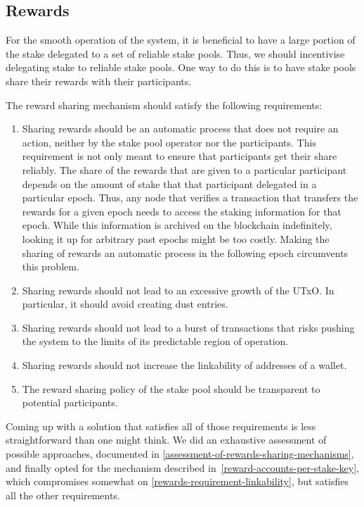 \documentclass[11pt,a4paper]{article}
\begin{document}
\subsection{Rewards}
\label{rewards}

For the smooth operation of the system, it is beneficial to have a large
portion of the stake delegated to a set of reliable stake pools. Thus,
we should incentivise delegating stake to reliable stake pools. One way
to do this is to have stake pools share their rewards with their
participants.

The reward sharing mechanism should satisfy the following requirements:

\begin{enumerate}
\item
  Sharing rewards should be an automatic process that does not require
  an action, neither by the stake pool operator nor the participants.
  This requirement is not only meant to ensure that participants get
  their share reliably. The share of the rewards that are given to a
  particular participant depends on the amount of stake that that
  participant delegated in a particular epoch. Thus, any node that
  verifies a transaction that transfers the rewards for a given epoch
  needs to access the staking information for that epoch. While this
  information is archived on the blockchain indefinitely, looking it up
  for arbitrary past epochs might be too costly. Making the sharing of
  rewards an automatic process in the following epoch circumvents this
  problem.
\item
  Sharing rewards should not lead to an excessive growth of the UTxO. In
  particular, it should avoid creating dust entries.
\item
  Sharing rewards should not lead to a burst of transactions that risks
  pushing the system to the limits of its predictable region of
  operation.
\item\label{rewards-requirement-linkability}
  Sharing rewards should not increase the linkability of addresses of a
  wallet.
\item
  The reward sharing policy of the stake pool should be transparent to
  potential participants.
\end{enumerate}

Coming up with a solution that satisfies all of those requirements is
less straightforward than one might think. We did an exhaustive
assessment of possible approaches, documented in
\cref{assessment-of-rewards-sharing-mechanisms}, and finally opted for
the mechanism described in~\ref{reward-accounts-per-stake-key}, which
compromises somewhat on \cref{rewards-requirement-linkability}, but
satisfies all the other requirements.
\end{document}
